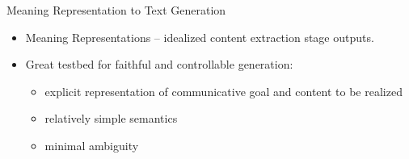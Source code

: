 \begin{frame}{Meaning Representation to Text Generation}

\begin{itemize}
\item Meaning Representations -- idealized content extraction stage outputs.

\vspace{10pt}
        \item    Great testbed for faithful and controllable generation:

            \begin{itemize}
                    \item explicit representation of communicative goal and 
                        content to be realized
                    \item relatively simple semantics
                    \item minimal ambiguity 
        \end{itemize}
        \end{itemize}


\end{frame}



